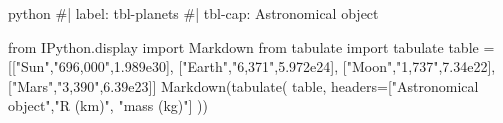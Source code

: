 \documentclass[
  11pt,
  letterpaper,
]{book}
\newenvironment{Shaded}{\begin{snugshade}}{\end{snugshade}}
\newcommand{\CommentTok}[1]{\textcolor[rgb]{0.37,0.37,0.37}{#1}}
\newcommand{\NormalTok}[1]{\textcolor[rgb]{0.00,0.23,0.31}{#1}}
\newcommand{\OtherTok}[1]{\textcolor[rgb]{0.00,0.23,0.31}{#1}}
\begin{document}
\begin{Shaded}
\begin{Highlighting}[]
\NormalTok{python}
\NormalTok{\#| label: tbl{-}planets}
\NormalTok{\#| tbl{-}cap: Astronomical object}

\NormalTok{from IPython.display import Markdown}
\NormalTok{from tabulate import tabulate}
\NormalTok{table = [}\CommentTok{[}\OtherTok{"Sun","696,000",1.989e30}\CommentTok{]}\NormalTok{,}
         \CommentTok{[}\OtherTok{"Earth","6,371",5.972e24}\CommentTok{]}\NormalTok{,}
         \CommentTok{[}\OtherTok{"Moon","1,737",7.34e22}\CommentTok{]}\NormalTok{,}
         \CommentTok{[}\OtherTok{"Mars","3,390",6.39e23}\CommentTok{]}\NormalTok{]}
\NormalTok{Markdown(tabulate(}
\NormalTok{  table, }
\NormalTok{  headers=}\CommentTok{[}\OtherTok{"Astronomical object","R (km)", "mass (kg)"}\CommentTok{]}
\NormalTok{))}
\end{Highlighting}
\end{Shaded}
\end{document}
